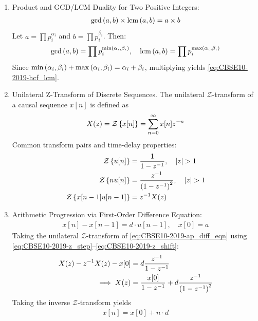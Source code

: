 \documentclass[12pt,a4paper]{article}
\begin{document}
\begin{enumerate}[label=\thesubsection.\arabic*, ref=\thesubsection.\theenumi]
	\item Product and GCD/LCM Duality for Two Positive Integers:
	\begin{align}
		\gcd\left(a, b\right) \times \operatorname{lcm}\left(a, b\right) = a \times b \label{eq:CBSE10-2019-hcf_lcm}
	\end{align}
	\solution
	Let $a = \prod p_i^{\alpha_i}$ and $b = \prod p_i^{\beta_i}$. Then:
	\begin{align}
		\gcd\left(a,b\right) = \prod p_i^{\min\left(\alpha_i, \beta_i\right)}, \quad \operatorname{lcm}\left(a,b\right) = \prod p_i^{\max\left(\alpha_i, \beta_i\right)}
	\end{align}
	Since $\min\left(\alpha_i, \beta_i\right) + \max\left(\alpha_i, \beta_i\right) = \alpha_i + \beta_i$, multiplying yields \eqref{eq:CBSE10-2019-hcf_lcm}.
	
	\item Unilateral Z-Transform of Discrete Sequences.
	The unilateral $\mathcal{Z}$-transform of a causal sequence $x[n]$ is defined as
	\begin{align}
		X(z) = \mathcal{Z}\left\{x[n]\right\} = \sum_{n=0}^{\infty} x[n]z^{-n} \label{eq:CBSE10-2019-z_transform_def}
	\end{align}
	Common transform pairs and time-delay properties:
	\begin{align}
		\mathcal{Z}\left\{u[n]\right\} &= \frac{1}{1 - z^{-1}}, \quad \left\vert z\right\vert > 1 \label{eq:CBSE10-2019-z_step} \\
		\mathcal{Z}\left\{n u[n]\right\} &= \frac{z^{-1}}{\left(1 - z^{-1}\right)^2}, \quad \left\vert z\right\vert > 1 \label{eq:CBSE10-2019-z_ramp} \\
		\mathcal{Z}\left\{x[n-1]u[n-1]\right\} &= z^{-1}X(z) \label{eq:CBSE10-2019-z_shift}
	\end{align}
	
	\item Arithmetic Progression via First-Order Difference Equation:
	\begin{align}
		x[n] - x[n-1] = d \cdot u[n-1], \quad x[0] = a \label{eq:CBSE10-2019-ap_diff_eqn}
	\end{align}
	\solution
	Taking the unilateral $\mathcal{Z}$-transform of \eqref{eq:CBSE10-2019-ap_diff_eqn} using \eqref{eq:CBSE10-2019-z_step}--\eqref{eq:CBSE10-2019-z_shift}:
	\begin{align}
		X(z) - z^{-1}X(z) - x[0] &= d \frac{z^{-1}}{1 - z^{-1}} \\
		\implies X(z) &= \frac{x[0]}{1 - z^{-1}} + d \frac{z^{-1}}{\left(1 - z^{-1}\right)^2}
	\end{align}
	Taking the inverse $\mathcal{Z}$-transform yields
	\begin{align}
		x[n] = x[0] + n \cdot d \label{eq:CBSE10-2019-ap_nth_term}
	\end{align}
	

\end{enumerate}
\end{document}
